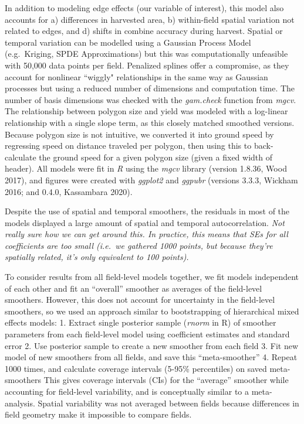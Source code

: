 \documentclass[]{elsarticle} %
\begin{document}
In addition to modeling edge effects (our variable of interest), this model also accounts for a) differences in harvested area, b) within-field spatial variation not related to edges, and d) shifts in combine accuracy during harvest.
Spatial or temporal variation can be modelled using a Gaussian Process Model (e.g.~Kriging, SPDE Approximations) but this was computationally unfeasible with 50,000 data points per field.
Penalized splines offer a compromise, as they account for nonlinear ``wiggly" relationships in the same way as Gaussian processes but using a reduced number of dimensions and computation time.
The number of basis dimensions was checked with the \emph{gam.check} function from \emph{mgcv}.
The relationship between polygon size and yield was modeled with a log-linear relationship with a single slope term, as this closely matched smoothed versions.
Because polygon size is not intuitive, we converted it into ground speed by regressing speed on distance traveled per polygon, then using this to back-calculate the ground speed for a given polygon size (given a fixed width of header).
All models were fit in \emph{R} using the \emph{mgcv} library (version 1.8.36, Wood 2017), and figures were created with \emph{ggplot2} and \emph{ggpubr} (versions 3.3.3, Wickham 2016; and 0.4.0, Kassambara 2020).

Despite the use of spatial and temporal smoothers, the residuals in most of the models displayed a large amount of spatial and temporal autocorrelation.
\emph{Not really sure how we can get around this. In practice, this means that SEs for all coefficients are too small (i.e.~we gathered 1000 points, but because they're spatially related, it's only equivalent to 100 points).}

To consider results from all field-level models together, we fit models independent of each other and fit an ``overall'' smoother as averages of the field-level smoothers.
However, this does not account for uncertainty in the field-level smoothers, so we used an approach similar to bootstrapping of hierarchical mixed effects models:
1. Extract single posterior sample (\emph{rnorm} in R) of smoother parameters from each field-level model using coefficient estimates and standard error
2. Use posterior sample to create a new smoother from each field
3. Fit new model of new smoothers from all fields, and save this ``meta-smoother''
4. Repeat 1000 times, and calculate coverage intervals (5-95\% percentiles) on saved meta-smoothers
This gives coverage intervals (CIs) for the ``average'' smoother while accounting for field-level variability, and is conceptually similar to a meta-analysis.
Spatial variability was not averaged between fields because differences in field geometry make it impossible to compare fields.
\end{document}
